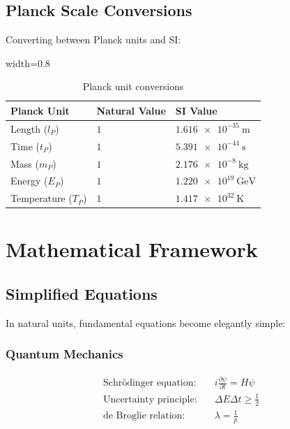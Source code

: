 	\subsection{Planck Scale Conversions}
	
	Converting between Planck units and SI:
	
	\begin{table}[htbp]
		\centering
		\begin{adjustbox}{width=0.8\textwidth}
			\begin{tabular}{lll}
				\toprule
				\textbf{Planck Unit} & \textbf{Natural Value} & \textbf{SI Value} \\
				\midrule
				Length ($l_P$) & $1$ & $\SI{1.616e-35}{\meter}$ \\
				Time ($t_P$) & $1$ & $\SI{5.391e-44}{\second}$ \\
				Mass ($m_P$) & $1$ & $\SI{2.176e-8}{\kilogram}$ \\
				Energy ($E_P$) & $1$ & $\SI{1.220e19}{\giga\electronvolt}$ \\
				Temperature ($T_P$) & $1$ & $\SI{1.417e32}{\kelvin}$ \\
				\bottomrule
			\end{tabular}
		\end{adjustbox}
		\caption{Planck unit conversions}
		\label{tab:planck_conversions}
	\end{table}
	
	\section{Mathematical Framework}
	
	\subsection{Simplified Equations}
	
	In natural units, fundamental equations become elegantly simple:
	
	\subsubsection{Quantum Mechanics}
	\begin{align}
		\text{Schrödinger equation:} \quad & i\frac{\partial\psi}{\partial t} = H\psi \\
		\text{Uncertainty principle:} \quad & \Delta E \Delta t \geq \frac{1}{2} \\
		\text{de Broglie relation:} \quad & \lambda = \frac{1}{p}
	\end{align}
	
